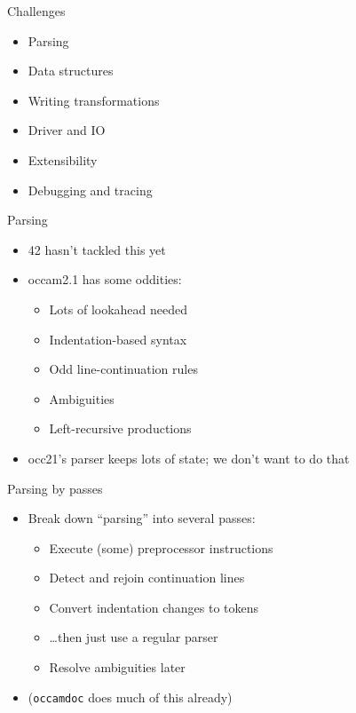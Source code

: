 \documentclass[adam,pdf,slideColor]{prosper}
\begin{document}
\begin{slide}{Challenges}
\begin{itemize}
\item Parsing
\item Data structures
\item Writing transformations
\item Driver and IO
\item Extensibility
\item Debugging and tracing
\end{itemize}
\end{slide}

\begin{slide}{Parsing}
\begin{itemize}
\item 42 hasn't tackled this yet
\item occam2.1 has some oddities:
\begin{itemize}
\item Lots of lookahead needed
\item Indentation-based syntax
\item Odd line-continuation rules
\item Ambiguities
\item Left-recursive productions
\end{itemize}
\item occ21's parser keeps lots of state; we don't want to do that
\end{itemize}
\end{slide}

\begin{slide}{Parsing by passes}
\begin{itemize}
\item Break down ``parsing'' into several passes:
\begin{itemize}
\item Execute (some) preprocessor instructions
\item Detect and rejoin continuation lines
\item Convert indentation changes to tokens
\item \ldots then just use a regular parser
\item Resolve ambiguities later
\end{itemize}
\item (\verb|occamdoc| does much of this already)
\end{itemize}
\end{slide}
\end{document}
